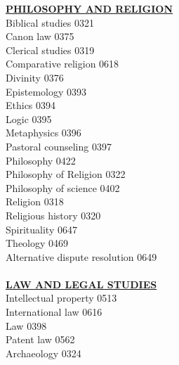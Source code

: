 \documentclass[9pt,twoside]{article}
\newcommand{\categoryheading}[1]{{\fontsize{8}{11}\selectfont \textbf{\uline{#1}}}}
\begin{document}
{\begin{multicols}{3}
\categoryheading{PHILOSOPHY AND RELIGION} \\
Biblical studies \hfill 0321 \\
Canon law \hfill 0375 \\
Clerical studies \hfill 0319 \\
Comparative religion \hfill 0618 \\
Divinity \hfill 0376 \\
Epistemology \hfill 0393 \\
Ethics \hfill 0394 \\
Logic \hfill 0395 \\
Metaphysics \hfill 0396 \\
Pastoral counseling \hfill 0397 \\
Philosophy \hfill 0422 \\
Philosophy of Religion \hfill 0322 \\
Philosophy of science \hfill 0402 \\
Religion \hfill 0318 \\
Religious history \hfill 0320 \\
Spirituality \hfill 0647 \\
Theology \hfill 0469 \\
Alternative dispute resolution \hfill 0649 \\
\columnbreak \\
\categoryheading{LAW AND LEGAL STUDIES} \\
Intellectual property \hfill 0513 \\
International law \hfill 0616 \\
Law \hfill 0398 \\
Patent law \hfill 0562 \\
Archaeology \hfill 0324


\end{multicols}}
\end{document}
